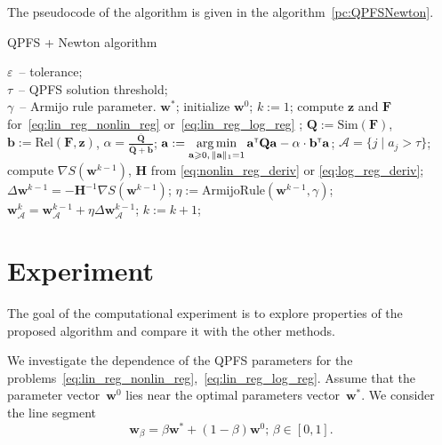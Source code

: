 \documentclass[a4paper,12pt]{article}
\renewcommand{\geq}{\ensuremath{\geqslant}}
\theoremstyle{plain} %
\theoremstyle{definition} %
\theoremstyle{remark} %
\newcommand{\ba}{\mathbf{a}}
\newcommand{\bb}{\mathbf{b}}
\newcommand{\bw}{\mathbf{w}}
\newcommand{\bz}{\mathbf{z}}
\newcommand{\cA}{\mathcal{A}}
\newcommand{\bQ}{\mathbf{Q}}
\newcommand{\bH}{\mathbf{H}}
\newcommand{\bF}{\mathbf{F}}
\newcommand{\T}{{\text{\tiny\sffamily\upshape\mdseries T}}}
\newcommand{\argmin}{\mathop{\arg \min}\limits}
\begin{document}
	The pseudocode of the algorithm is given in the algorithm~\eqref{pc:QPFSNewton}.
	\begin{algorithm}
		\caption{QPFS + Newton algorithm}
		\label{pc:QPFSNewton}
		\begin{algorithmic}
			\REQUIRE $\varepsilon$~-- tolerance;\\
			\hspace{1.53cm}$\tau$~-- QPFS solution threshold;\\
			\hspace{1.53cm}$\gamma$~-- Armijo rule parameter.
			\ENSURE $\bw^*$;
			\STATE  initialize $\bw^0$;
			\STATE $k := 1$;
			\REPEAT
			\STATE compute $\bz$ and $\bF$ for~\eqref{eq:lin_reg_nonlin_reg} or~\eqref{eq:lin_reg_log_reg} ;
			\vspace{0.1cm}
			\STATE $\bQ := \text{Sim} (\bF)$, $\bb := \text{Rel}(\bF, \bz)$, $\alpha = \frac{\overline{\bQ}}{\overline{\bQ} + \overline{\bb}}$;
			\vspace{0.1cm}
			\STATE $\ba := \argmin_{\ba \geq 0, \, \|\ba\|_1=1}\ba^{\T} \bQ \ba - \alpha \cdot \mathbf{b}^{\T} \ba$;
			\vspace{0.1cm}
			\STATE $\cA = \{j \mid a_j > \tau\}$;
			\vspace{0.1cm}
			\STATE compute $\nabla S(\bw^{k-1})$, $\bH$ from \eqref{eq:nonlin_reg_deriv} or \eqref{eq:log_reg_deriv};
			\vspace{0.1cm}
			\STATE $\Delta \bw^{k-1} = - \bH^{-1} \nabla S(\bw^{k-1})$;
			\vspace{0.1cm}
			\STATE $\eta := \text{ArmijoRule}(\bw^{k-1}, \gamma)$;
			\vspace{0.1cm}
			\STATE $\bw_{\cA}^k = \bw_{\cA}^{k - 1} + \eta \Delta \bw_{\cA}^{k - 1}$;
			\vspace{0.1cm}
			\STATE $k := k + 1$;
			\vspace{0.1cm}
			\UNTIL{$\frac{\| \bw^k - \bw^{k-1} \|}{\| \bw^k \|} < \varepsilon$}
		\end{algorithmic}
	\end{algorithm}
	
  	\section*{Experiment}
  	The goal of the computational experiment is to explore properties of the proposed algorithm and compare it with the other methods. 
  	
  	We investigate the dependence of the QPFS parameters for the problems~\eqref{eq:lin_reg_nonlin_reg},~\eqref{eq:lin_reg_log_reg}. 
  	Assume that the parameter vector~$\bw^0$ lies near the optimal parameters vector~$\bw^*$. 
  	We consider the line segment
  	\[
  	\bw_{\beta} = \beta \bw^* + (1 - \beta) \bw^0; \, \beta \in [0, 1] .
  	\]
  	
\end{document}
